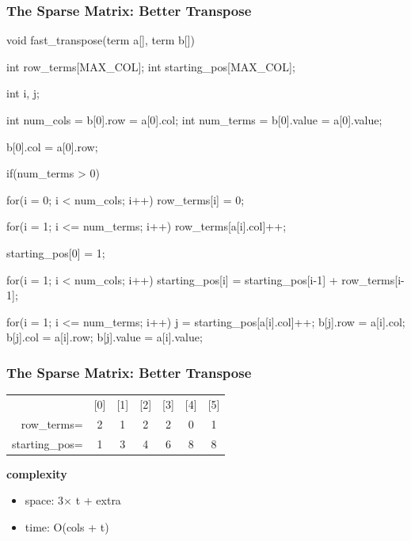 \documentclass[newPxFont,sthlmFooter,nooffset]{beamer}
\begin{document}
\begin{frame}
  \frametitle{The Sparse Matrix: Better Transpose}
\begin{codedef}
void fast_transpose(term a[], term b[]){
    int row_terms[MAX_COL];
    int starting_pos[MAX_COL];
    
    int i, j;
    
    int num_cols = b[0].row = a[0].col;
    int num_terms = b[0].value = a[0].value;

    b[0].col = a[0].row;

    if(num_terms > 0) {
        for(i = 0; i < num_cols; i++)
            row_terms[i] = 0;

        for(i = 1; i <= num_terms; i++)
            row_terms[a[i].col]++;

        starting_pos[0] = 1;

        for(i = 1; i < num_cols; i++)
            starting_pos[i] = starting_pos[i-1] + row_terms[i-1];

        for(i = 1; i <= num_terms; i++){
            j = starting_pos[a[i].col]++;
            b[j].row = a[i].col;
            b[j].col = a[i].row;
            b[j].value = a[i].value;
        }
    }
}  
\end{codedef}
\end{frame}

\begin{frame}[t, fragile]
  \frametitle{The Sparse Matrix: Better Transpose}
  \begin{tabular}{r  *{6}{c}}
    & [0] & [1] & [2] & [3] & [4] & [5] \\
row\_terms= & 2 & 1 & 2 & 2 & 0 & 1 \\
starting\_pos= & 1 & 3 & 4 & 6 & 8 & 8\\
  \end{tabular}

\textbf{complexity}
\begin{itemize}
\item space: 3$\times$ t + extra
\item time: O(cols + t)
\end{itemize}
\end{frame}
\end{document}
